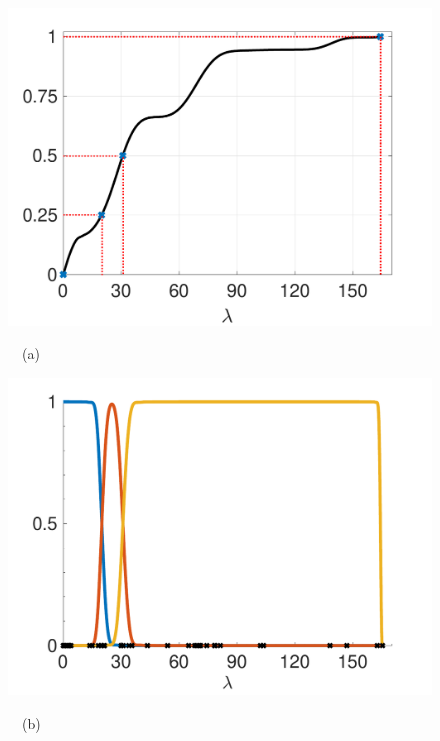 \documentclass[journal, 10pt]{IEEEtran}
\begin{document}
{\begin{figure}[tbh]
\begin{minipage}[m]{0.49\linewidth}
\centerline{\includegraphics[width=1.1\linewidth]{fig_cdf}}
\centerline{~~\small{(a)}}
\end{minipage}
\begin{minipage}[m]{0.49\linewidth}
\centerline{\includegraphics[width=1.1\linewidth]{fig_orig_fb}}
\centerline{~~\small{(b)}}
\end{minipage} \\
\begin{minipage}[m]{0.49\linewidth}

\end{minipage}
\end{figure}}
\end{document}
